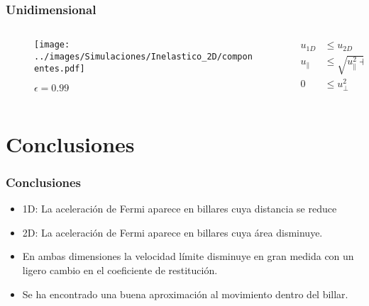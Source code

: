 \documentclass{beamer}
\begin{document}
\begin{frame}[t]
    \frametitle[prueb1]{Unidimensional}
    \begin{columns}
        \begin{column}{0.5\textwidth}
            \begin{figure}
                \centering
                \texttt{[image: ../images/Simulaciones/Inelastico\_2D/componentes.pdf]}
                \caption{\( \epsilon = 0.99 \)}  
            \end{figure}         
        \end{column}
    \begin{column}{0.5\textwidth}
        \begin{align}
            u_{1D} &\leq u_{2D} \nonumber\\
            u_{\parallel} &\leq \sqrt{u_\parallel^2 + u_\perp^2}\\
             0 &\leq u_\perp^2 \nonumber
        \end{align}
    \end{column}
    \end{columns}
\end{frame}


\section{Conclusiones}

\begin{frame}
    \frametitle[prueb1]{Conclusiones}
    \begin{itemize}
        \item 1D: La aceleración de Fermi aparece en billares cuya distancia se reduce
        \item 2D: La aceleración de Fermi aparece en billares cuya área disminuye.
        \item En ambas dimensiones la velocidad límite disminuye en gran medida con un ligero cambio en el coeficiente de restitución.
        \item Se ha encontrado una buena aproximación al movimiento dentro del billar.
    \end{itemize}
\end{frame}

\end{document}
